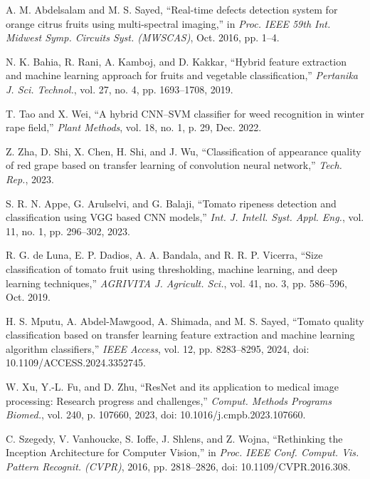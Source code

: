 \documentclass[12pt,a4paper]{report}
\begin{document}
\begin{thebibliography}{23}
	
	 A. M. Abdelsalam and M. S. Sayed, ``Real-time defects detection system for orange citrus fruits using multi-spectral imaging,'' in \textit{Proc. IEEE 59th Int. Midwest Symp. Circuits Syst. (MWSCAS)}, Oct. 2016, pp. 1--4.
	
	 N. K. Bahia, R. Rani, A. Kamboj, and D. Kakkar, ``Hybrid feature extraction and machine learning approach for fruits and vegetable classification,'' \textit{Pertanika J. Sci. Technol.}, vol. 27, no. 4, pp. 1693--1708, 2019.
	
	 T. Tao and X. Wei, ``A hybrid CNN–SVM classifier for weed recognition in winter rape field,'' \textit{Plant Methods}, vol. 18, no. 1, p. 29, Dec. 2022.
	
	 Z. Zha, D. Shi, X. Chen, H. Shi, and J. Wu, ``Classification of appearance quality of red grape based on transfer learning of convolution neural network,'' \textit{Tech. Rep.}, 2023.
	
	 S. R. N. Appe, G. Arulselvi, and G. Balaji, ``Tomato ripeness detection and classification using VGG based CNN models,'' \textit{Int. J. Intell. Syst. Appl. Eng.}, vol. 11, no. 1, pp. 296--302, 2023.
	
	 R. G. de Luna, E. P. Dadios, A. A. Bandala, and R. R. P. Vicerra, ``Size classification of tomato fruit using thresholding, machine learning, and deep learning techniques,'' \textit{AGRIVITA J. Agricult. Sci.}, vol. 41, no. 3, pp. 586--596, Oct. 2019.
	
	 H. S. Mputu, A. Abdel-Mawgood, A. Shimada, and M. S. Sayed, ``Tomato quality classification based on transfer learning feature extraction and machine learning algorithm classifiers,'' \textit{IEEE Access}, vol. 12, pp. 8283--8295, 2024, doi: 10.1109/ACCESS.2024.3352745.
	
	 W. Xu, Y.-L. Fu, and D. Zhu, ``ResNet and its application to medical image processing: Research progress and challenges,'' \textit{Comput. Methods Programs Biomed.}, vol. 240, p. 107660, 2023, doi: 10.1016/j.cmpb.2023.107660.
	
	 C. Szegedy, V. Vanhoucke, S. Ioffe, J. Shlens, and Z. Wojna, ``Rethinking the Inception Architecture for Computer Vision,'' in \textit{Proc. IEEE Conf. Comput. Vis. Pattern Recognit. (CVPR)}, 2016, pp. 2818--2826, doi: 10.1109/CVPR.2016.308.
	

\end{thebibliography}
\end{document}
